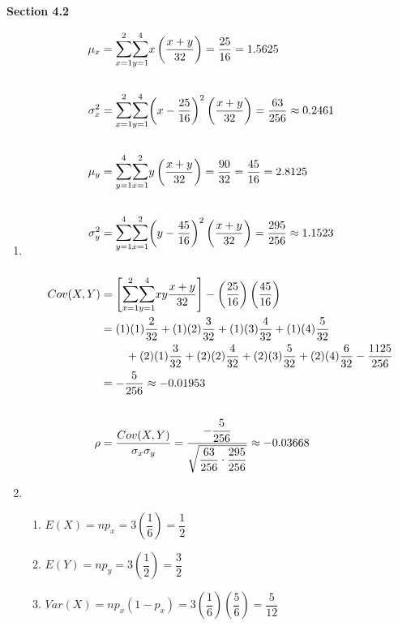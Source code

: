 \documentclass{article}
\newcommand\mfrac[2]{\left(\dfrac{#1}{#2}\right)}
\begin{document}
    \textbf{Section 4.2}
    \begin{enumerate}
     \item
      \begin{align*}
	 \mu_x &= \mathlarger{\sum}_{x=1}^2 \mathlarger{\sum}_{y=1}^4 {x\mfrac{x+y}{32}} 
	  = \dfrac{25}{16} = 1.5625 \\
	  \\
	 \sigma_x^2 &= \mathlarger{\sum}_{x=1}^2 \mathlarger{\sum}_{y=1}^4 
	      {\left(x-\dfrac{25}{16}\right)^2\mfrac{x+y}{32}}   
	  = \dfrac{63}{256} \approx 0.2461 \\
	  \\
	 \mu_y &= \mathlarger{\sum}_{y=1}^4 \mathlarger{\sum}_{x=1}^2 {y\mfrac{x+y}{32}} 
	  = \dfrac{90}{32} = \dfrac{45}{16} = 2.8125 \\
	  \\
	 \sigma_y^2 &= \mathlarger{\sum}_{y=1}^4 \mathlarger{\sum}_{x=1}^2
	      {\left(y-\dfrac{45}{16}\right)^2\left(\dfrac{x+y}{32}\right)}
	  = \dfrac{295}{256} \approx 1.1523 \\
	  \\
	 Cov(X,Y) &= \left[\mathlarger{\sum}_{x=1}^2 \mathlarger{\sum}_{y=1}^4 {xy \dfrac{x+y}{32}}\right] 
		- \mfrac{25}{16}\mfrac{45}{16} \\
	    &= (1)(1)\dfrac{2}{32} + (1)(2)\dfrac{3}{32} + (1)(3)\dfrac{4}{32} + (1)(4)\dfrac{5}{32} \\
	     &\mspace{40mu}+ (2)(1)\dfrac{3}{32} + (2)(2)\dfrac{4}{32} + (2)(3)\dfrac{5}{32} 
		+ (2)(4)\dfrac{6}{32} - \dfrac{1125}{256}\\
	    &= -\dfrac{5}{256} \approx -0.01953 \\
	  \\
	 \rho &= \dfrac{Cov(X,Y)}{\sigma_x\sigma_y} 
	    = \dfrac{-\dfrac{5}{256}}{\sqrt{\dfrac{63}{256}\cdot\dfrac{295}{256}}}
	    \approx -0.03668
      \end{align*}
     \addtocounter{enumi}{2}
     
     \newpage
     \item
      \begin{enumerate}
       \item $E(X) = np_x = 3\mfrac{1}{6} = \dfrac{1}{2}$
       
       \item $E(Y) = np_y = 3\mfrac{1}{2} = \dfrac{3}{2}$
       
       \item 
	$Var(X) = np_x(1-p_x) = 3\mfrac{1}{6}\mfrac{5}{6} = \dfrac{5}{12}$
       

\end{enumerate}
\end{enumerate}
\end{document}
